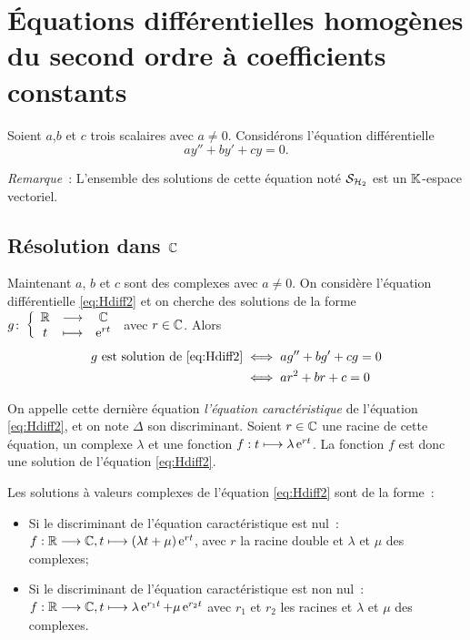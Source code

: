 \section{Équations différentielles homogènes du second ordre à coefficients constants}
\label{sec:eqdiffsecondordrecoefconstants}

Soient \(a\),\(b\) et \(c\) trois scalaires avec \(a \neq 0\). Considérons
l'équation différentielle
\begin{equation}
  \label{eq:Hdiff2}
  ay'' + by' + cy = 0.\tag{\(\H_2\)}
\end{equation}

\emph{Remarque}~: L'ensemble des solutions de cette équation noté \(\mathcal{S}_{\mathcal{H}_2}\) est un \(\mathbb{K}\)-espace vectoriel.

\subsection{Résolution dans \(\mathbb{C}\)}
\label{subsec:resdansC}

Maintenant \(a\), \(b\) et \(c\) sont des complexes avec \(a \neq 0\). On
considère l'équation différentielle \eqref{eq:Hdiff2} et on cherche des
solutions de la forme \(g\colon\left\{\begin{array}{ccc}\mathbb{R} & \longrightarrow &\mathbb{C}\\t & \longmapsto & \operatorname{e}^{rt}\end{array}\right.\) avec \(r \in \mathbb{C}\).
Alors
\begin{align}
  g\text{~est solution de } \eqref{eq:Hdiff2} & \iff ag'' + bg' + cg = 0  \\
                                              & \iff ar^2 + br + c = 0
\end{align}

On appelle cette dernière équation \emph{l'équation caractéristique} de
l'équation \eqref{eq:Hdiff2}, et on note \(\Delta\) son discriminant. Soient \(r
\in \mathbb{C}\) une racine de cette équation, un complexe \(\lambda\) et une fonction
\(f:t \longmapsto \lambda \operatorname{e}^{rt}\). La fonction \(f\) est donc une solution de
l'équation \eqref{eq:Hdiff2}.

\begin{theo}
  \label{theo:5}
  Les solutions à valeurs complexes de l'équation \eqref{eq:Hdiff2} sont de la forme~:
  \begin{itemize}
    \item Si le discriminant de l'équation caractéristique est nul~:
      \(f:\mathbb{R} \longrightarrow{} \mathbb{C}, t \longmapsto{} (\lambda t + \mu)\operatorname{e}^{rt}\), avec \(r\)
      la racine double et \(\lambda\) et \(\mu\) des complexes;
    \item Si le discriminant de l'équation caractéristique est non nul~:
      \(f:\mathbb{R} \longrightarrow{} \mathbb{C}, t \longmapsto{} \lambda \operatorname{e}^{r_1 t} + \mu \operatorname{e}^{r_2 t}\)
      avec \(r_1\) et \(r_2\) les racines et \(\lambda\) et \(\mu\) des
      complexes.
  \end{itemize}
\end{theo}

